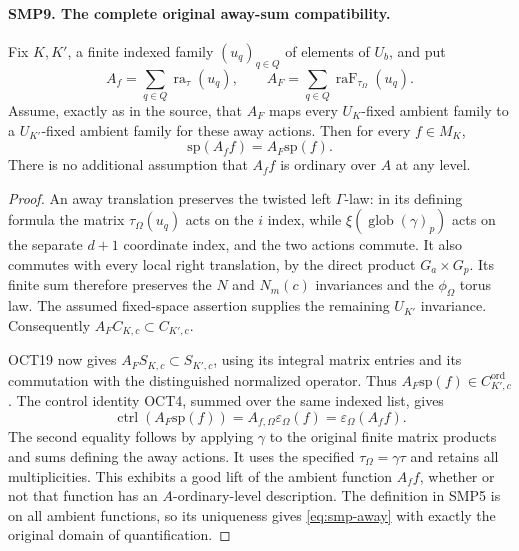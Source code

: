 \documentclass[11pt,a4paper]{article}
\numberwithin{equation}{section}
\theoremstyle{remark}\newtheorem{remark}[theorem]{Remark}
\begin{document}
\paragraph{SMP9. The complete original away-sum compatibility.}
\label{claim:SMP9}
Fix $K,\allowbreak{} K'$, a finite indexed family $(u_q)_{q\in Q}$
of elements of $U_b$, and put
\[
 A_f=\sum_{q\in Q}\operatorname{ra}_{\tau}(u_q),
 \qquad A_F=\sum_{q\in Q}
                      \operatorname{raF}_{\tau_\Omega}(u_q).
\]
Assume, exactly as in the source, that $A_F$ maps
every $U_K$-fixed ambient family to a $U_{K'}$-fixed
ambient family for these away actions.  Then for
every $f\in M_K$,
\begin{equation}\label{eq:smp-away}
                   \mathrm{sp}(A_f f)=A_F\mathrm{sp}(f).
\end{equation}
There is no additional assumption that $A_f f$ is
ordinary over $A$ at any level.
\begin{proof}
An away translation preserves the twisted left
$\Gamma$-law: in its defining formula the matrix
$\tau_\Omega(u_q)$ acts on the $i$ index, while
$\xi(\operatorname{glob}(\gamma)_p)$ acts on the
separate $d+1$ coordinate index, and the two actions
commute.  It also commutes with every local right
translation, by the direct product $G_a\times G_p$.
Its finite sum therefore preserves the $N$ and
$N_m(c)$ invariances and the $\phi_\Omega$ torus law.
The assumed fixed-space assertion supplies the
remaining $U_{K'}$ invariance.  Consequently
$A_F C_{K,\allowbreak{} c}\subset C_{K',\allowbreak{} c}$.

OCT19 now gives
$A_F S_{K,\allowbreak{} c}\subset S_{K',\allowbreak{} c}$, using its integral
matrix entries and its commutation with the
distinguished normalized operator.  Thus
$A_F\mathrm{sp}(f)\in C^{\mathrm{ord}}_{K',\allowbreak{} c}$.
The control identity OCT4, summed over the same
indexed list, gives
\[
 \operatorname{ctrl}(A_F\mathrm{sp}(f))
       =A_{f,\Omega}\varepsilon_\Omega(f)
       =\varepsilon_\Omega(A_f f).
\]
The second equality follows by applying $\gamma$
to the original finite matrix products and sums
defining the away actions.  It uses the specified
$\tau_\Omega=\gamma\tau$ and retains all multiplicities.
This exhibits a good lift of the ambient function
$A_f f$, whether or not that function has an
$A$-ordinary-level description.  The definition in
SMP5 is on all ambient functions, so its uniqueness
gives \eqref{eq:smp-away} with exactly the original
domain of quantification.
\end{proof}
\end{document}
